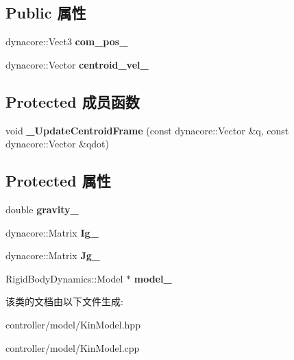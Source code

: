\subsection*{Public 属性}
\begin{DoxyCompactItemize}
\item 
\mbox{\label{classquadruped_1_1KinModel_ad68d2a66e974b49e4eef5a7711ea21ec}} 
dynacore\+::\+Vect3 {\bfseries com\+\_\+pos\+\_\+}
\item 
\mbox{\label{classquadruped_1_1KinModel_a36cf1910dab85ceae45132caaa7b2311}} 
dynacore\+::\+Vector {\bfseries centroid\+\_\+vel\+\_\+}
\end{DoxyCompactItemize}
\subsection*{Protected 成员函数}
\begin{DoxyCompactItemize}
\item 
\mbox{\label{classquadruped_1_1KinModel_adc0f8aae34d180782693a3cb153040bf}} 
void {\bfseries \+\_\+\+Update\+Centroid\+Frame} (const dynacore\+::\+Vector \&q, const dynacore\+::\+Vector \&qdot)
\end{DoxyCompactItemize}
\subsection*{Protected 属性}
\begin{DoxyCompactItemize}
\item 
\mbox{\label{classquadruped_1_1KinModel_a58cbea050656719f6e53d1d42e18d0e9}} 
double {\bfseries gravity\+\_\+}
\item 
\mbox{\label{classquadruped_1_1KinModel_a5fb7ebc997f0ba3074da8405c487da48}} 
dynacore\+::\+Matrix {\bfseries Ig\+\_\+}
\item 
\mbox{\label{classquadruped_1_1KinModel_a580c0ce1458f5ce3afef017619295126}} 
dynacore\+::\+Matrix {\bfseries Jg\+\_\+}
\item 
\mbox{\label{classquadruped_1_1KinModel_a2549c56534d720926cab2abf7f85572c}} 
Rigid\+Body\+Dynamics\+::\+Model $\ast$ {\bfseries model\+\_\+}
\end{DoxyCompactItemize}


该类的文档由以下文件生成\+:\begin{DoxyCompactItemize}
\item 
controller/model/Kin\+Model.\+hpp\item 
controller/model/Kin\+Model.\+cpp\end{DoxyCompactItemize}
